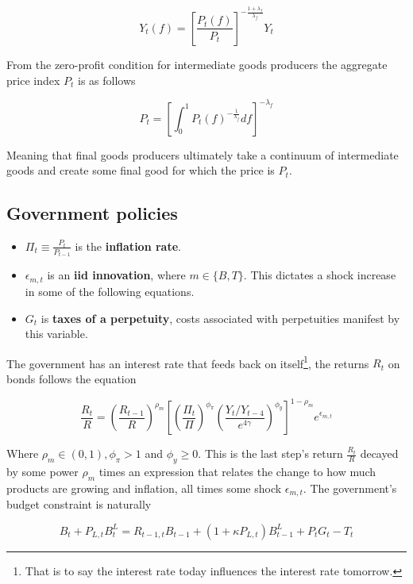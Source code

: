 \documentclass[notitlepage,12pt]{report}
\begin{document}
\begin{appendices}
	\begin{equation}
	Y_t(f)=\left[\frac{P_t(f)}{P_t}\right]^{-\frac{1+\lambda_f}{\lambda_f}}Y_t
	\end{equation}
	
	From the zero-profit condition for intermediate goods producers the aggregate price index \(P_t\) is as follows
	
	\begin{equation}
	P_t=\left[\int_0^1P_t(f)^{-\frac{1}{\lambda_f}}df\right]^{-\lambda_f}
	\end{equation}
	
	Meaning that final goods producers ultimately take a continuum of intermediate goods and create some final good for which the price is \(P_t\).
	
	\subsection{Government policies}
	
	\begin{itemize}
		\item \(\Pi_t\equiv\frac{P_t}{P_{t-1}}\) is the {\bf inflation rate}.
		\item \(\epsilon_{m,t}\) is an {\bf iid innovation}, where \(m\in\{B,T\}\). This dictates a shock increase in some of the following equations.
		\item \(G_t\) is {\bf taxes of a perpetuity}, costs associated with perpetuities manifest by this variable.
	\end{itemize}
	
	The government has an interest rate that feeds back on itself\footnote{That is to say the interest rate today influences the interest rate tomorrow.}, the returns \(R_t\) on bonds follows the equation
	
	\begin{equation}
	\frac{R_t}{R}=\left(\frac{R_{t-1}}{R}\right)^{\rho_m}\left[\left(\frac{\Pi_t}{\Pi}\right)^{\phi_\pi}\left(\frac{Y_t/Y_{t-4}}{e^{4\gamma}}\right)^{\phi_y}\right]^{1-\rho_m}e^{\epsilon_{m,t}}
	\end{equation}
	
	Where \(\rho_m\in(0,1),\phi_\pi>1\) and \(\phi_y\geq0\). This is the last step's return \(\frac{R_t}{R}\) decayed by some power \(\rho_m\) times an expression that relates the change to how much products are growing and inflation, all times some shock \(\epsilon_{m,t}\). The government's budget constraint is naturally
	
	\begin{equation}
	B_t+P_{L,t}B_t^L=R_{t-1,t}B_{t-1}+(1+\kappa P_{L,t})B_{t-1}^L+P_tG_t-T_t
	\end{equation}
	

\end{appendices}
\end{document}
